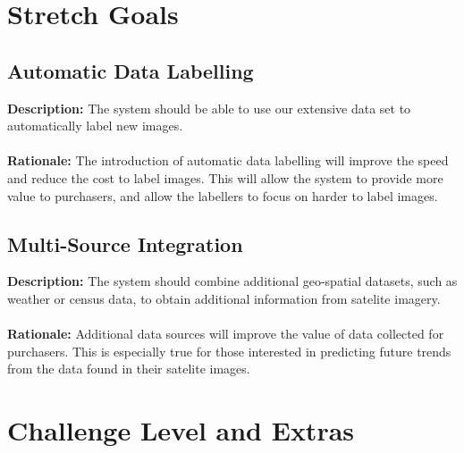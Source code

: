 \documentclass{article}
\begin{document}
\section{Stretch Goals}
\subsection{Automatic Data Labelling}
\textbf{Description: }The system should be able to use our extensive data set to automatically label new images. \\\\
\textbf{Rationale: }The introduction of automatic data labelling will improve the speed and reduce the cost to label images. This will allow the system to provide more value to 
purchasers, and allow the labellers to focus on harder to label images.
\subsection{Multi-Source Integration}
\textbf{Description: }The system should combine additional geo-spatial datasets, such as weather or census data, to obtain additional information from satelite imagery. \\\\
\textbf{Rationale: }Additional data sources will improve the value of data collected for purchasers. This is especially true for those interested in predicting future trends from the 
data found in their satelite images.



\section{Challenge Level and Extras}
\end{document}
